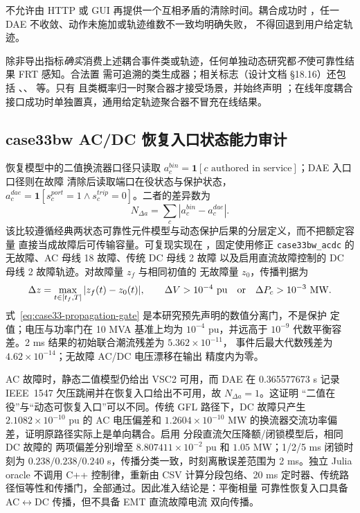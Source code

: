不允许由 HTTP 或 GUI 再提供一个互相矛盾的清除时间。耦合成功时
，任一 DAE 不收敛、动作未施加或轨迹维数不一致均明确失败，
不得回退到用户给定轨迹。
\begin{boundarynote}
除非导出指标\emph{确实}消费上述耦合事件类或轨迹，任何单独动态研究都\emph{不}使可靠性结果 FRT 感知。合法置
 需可追溯的类生成器；相关标志（设计文档 \S18.16）还包括
、、
等。只有  且类概率归一时聚合器才接受场景，并始终声明
；在线年度耦合接口成功时单独置真，通用给定轨迹聚合器不冒充在线结果。
\end{boundarynote}

\subsection{case33bw AC/DC 恢复入口状态能力审计}
\label{sec:rel-pf-case33-propagation}
恢复模型中的二值换流器口径只读取
$a_c^{bin}=\mathbf 1[c\text{ authored in service}]$；DAE 入口口径则在故障
清除后读取端口在役状态与保护状态，
$a_c^{dae}=\mathbf 1[s_c^{port}=1\land s_c^{trip}=0]$。二者的差异数为
\begin{equation}
 N_{\Delta a}=\sum_c\left|a_c^{bin}-a_c^{dae}\right|.
\end{equation}
该比较遵循经典两状态可靠性元件模型与动态保护后果的分层定义，而不把额定容量
直接当成故障后可传输容量。可复现实现在
，固定使用修正
\texttt{case33bw\_acdc} 的无故障、AC 母线 18 故障、传统 DC 母线 2 故障
以及启用直流故障控制的 DC 母线 2 故障轨迹。对故障量 $z_f$ 与相同初值的
无故障量 $z_0$，传播判据为
\begin{equation}
 \Delta z=\max_{t\in[t_f,T]}|z_f(t)-z_0(t)|,
 \qquad \Delta V>10^{-4}\ {\rm pu}\quad\text{or}\quad
 \Delta P_c>10^{-3}\ {\rm MW}.
 \label{eq:case33-propagation-gate}
\end{equation}
式~\eqref{eq:case33-propagation-gate} 是本研究预先声明的数值分离门，不是保护
定值；电压与功率门在 10 MVA 基准上均为 $10^{-4}$ pu，并远高于 $10^{-9}$
代数平衡容差。2 ms 结果的初始联合潮流残差为 $5.362\times10^{-11}$，
事件后最大代数残差为 $4.62\times10^{-14}$；无故障 AC/DC 电压漂移在输出
精度内为零。

AC 故障时，静态二值模型仍给出 VSC2 可用，而 DAE 在 0.365577673 s 记录
IEEE~1547 欠压跳闸并在恢复入口给出不可用，故 $N_{\Delta a}=1$。这证明
“二值在役”与“动态可恢复入口”可以不同。传统 GFL 路径下，DC 故障只产生
$2.1082\times10^{-10}$ pu 的 AC 电压偏差和 $1.2604\times10^{-10}$ MW
的换流器交流功率偏差，证明原路径实际上是单向耦合。启用
分段直流欠压降额/闭锁模型后，相同 DC 故障的
两项偏差分别增至 $8.807411\times10^{-2}$ pu 和 $1.05$ MW；1/2/5 ms
闭锁时刻为 $0.238/0.238/0.240$ s，传播分类一致，时刻离散误差范围为
2 ms。独立 Julia oracle 不调用 C++ 控制律，重新由 CSV 计算分段包络、20 ms
定时器、传统路径恒等性和传播门，全部通过。因此准入结论是：平衡相量
可靠性恢复入口具备 AC$\leftrightarrow$DC 传播，但不具备 EMT 直流故障电流
双向传播。

